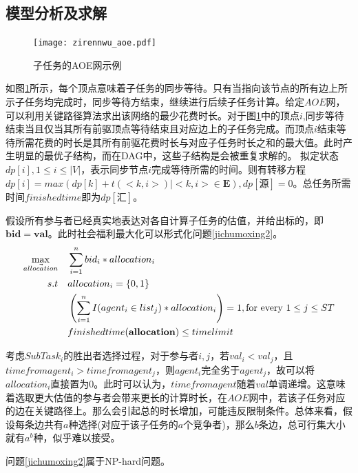 \documentclass[promaster]{thesis-uestc}
\begin{document}
\subsection{模型分析及求解}
\begin{figure}[h]
\texttt{[image: zirennwu\_aoe.pdf]}
\caption{子任务的AOE网示例}
\label{zirennwu_aoe}
\end{figure}

如图\ref{zirennwu_aoe}所示，每个顶点意味着子任务的同步等待。只有当指向该节点的所有边上所示子任务均完成时，同步等待方结束，继续进行后续子任务计算。给定$AOE$网，可以利用关键路径算法求出该网络的最少花费时长。对于图\ref{zirennwu_aoe}中的顶点$i$,同步等待结束当且仅当其所有前驱顶点等待结束且对应边上的子任务完成。而顶点$i$结束等待所需花费的时长是其所有前驱花费时长与对应子任务时长之和的最大值。此时产生明显的最优子结构，而在DAG中，这些子结构是会被重复求解的。
拟定状态$dp[i],1 \leq i\leq |V|$，表示同步节点$i$完成等待所需的时间。则有转移方程$dp[i] = max(dp[k]+t(<k,i>)|<k,i> \in \mathbf{E}),dp[\text{源}] = 0$。总任务所需时间$finishedtime$即为$dp[\text{汇}]$。

假设所有参与者已经真实地表达对各自计算子任务的估值，并给出标的，即$\mathbf{bid}=\mathbf{val}$。此时社会福利最大化可以形式化问题\ref{jichumoxing2}。
\begin{align}
    \label{jichumoxing2}\max_{\vec{allocation}} \quad&\sum_{i=1}^{n}{bid_i*allocation_i}\\
    s.t                     \quad&allocation_i = \{0,1\}\notag\\
    \quad&\left(\sum_{i=1}^{n}{I(agent_i \in list_j)*allocation_i}\right) = 1,\text{for every }1 \leq j \leq ST\notag\\
    \quad&finishedtime(\mathbf{allocation}) \leq timelimit
    \notag
\end{align}

考虑$SubTask_i$的胜出者选择过程，对于参与者$i,j$，若$val_i < val_j$，且$timefromagent_i > timefromagent_j$，则$agent_i$完全劣于$agent_j$，故可以将$allocation_i$直接置为0。此时可以认为，$timefromagent$随着$val$单调递增。这意味着选取更大估值的参与者会带来更长的计算时长，在$AOE$网中，若该子任务对应的边在关键路径上。那么会引起总的时长增加，可能违反限制条件。总体来看，假设每条边共有$a$种选择(对应于该子任务的$a$个竞争者)，那么$b$条边，总可行集大小就有$a^b$种，似乎难以接受。

\begin{theorem}
   问题\ref{jichumoxing2}属于NP-hard问题。
\end{theorem}
\end{document}

